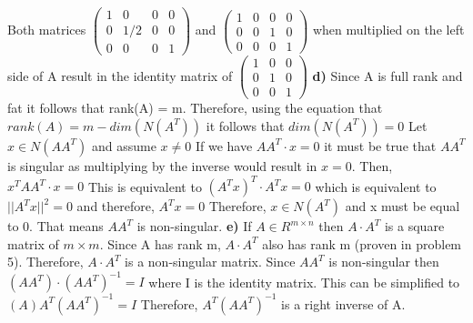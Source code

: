 \documentclass[12pt]{article}
\begin{document}
\newline
\newline
Both matrices $\left(\begin{array}{cccc} 1 & 0 & 0 & 0  \\ 0 & 1/2 & 0 & 0 \\ 0 &  0 & 0 & 1 \end{array}\right)$ and  $\left(\begin{array}{cccc} 1 & 0 & 0 & 0  \\ 0 & 0 & 1 & 0 \\ 0 &  0& 0 & 1 \end{array}\right)$ when multiplied on the left side of A result in the identity matrix of  
\newline
$\left(\begin{array}{ccc} 1 & 0 & 0   \\ 0 & 1 & 0 \\ 0 & 0 & 1 \end{array}\right)$
\newline
\textbf{d)}
\newline
Since A is full rank and fat it follows that rank(A) = m. Therefore, using the equation that $rank(A) = m - dim(N(A^{T}))$ it follows that $dim(N(A^{T})) = 0$
\newline
Let $x \in N(AA^{T})$ and assume $x \neq 0$
\newline
If we have $AA^{T} \cdot x = 0$ it must be true that $AA^{T}$ is singular as multiplying by the inverse would result in $x = 0$.
\newline
Then, $x^{T}AA^{T} \cdot x = 0$
\newline
This is equivalent to $(A^{T}x)^{T} \cdot A^{T}x = 0$ which is equivalent to $||A^{T}x||^{2} = 0$ and therefore, $A^{T}x = 0$
\newline
Therefore, $x \in N(A^{T})$ and x must be equal to 0. That means $AA^{T}$ is non-singular.
\newline
\textbf{e)}
\newline
If $A \in R^{m \times n}$ then $A \cdot A^{T}$ is a square matrix of $m \times m$. Since A has rank m, $A \cdot A^{T}$ also has rank m (proven in problem 5). Therefore, $A \cdot A^{T}$ is a non-singular matrix.
\newline
Since $AA^{T}$ is non-singular then  $(AA^{T}) \cdot (A A^{T})^{-1}= I$ where I is the identity matrix. This can be simplified to $(A)A^{T} (AA^{T})^{-1}= I$
\newline
Therefore, $A^{T} (AA^{T})^{-1}$ is a right inverse of A.
\newline
\end{document}
